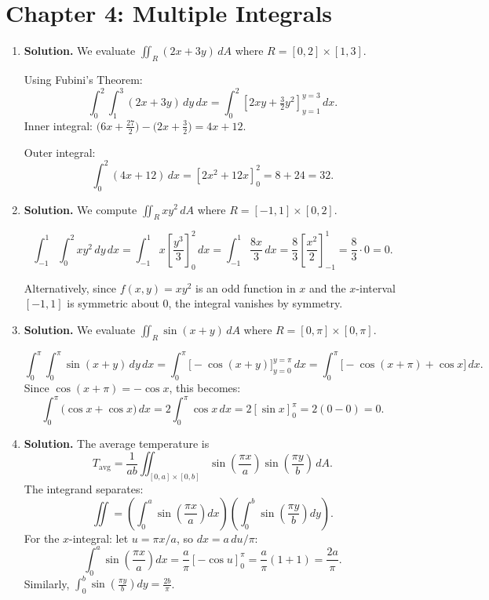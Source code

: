 \chapter{Chapter 4: Multiple Integrals}

\begin{enumerate}

\item \textbf{Solution.}
We evaluate $\displaystyle\iint_R (2x+3y)\,dA$ where $R=[0,2]\times[1,3]$.

Using Fubini's Theorem:
\[
\int_0^2\int_1^3 (2x+3y)\,dy\,dx = \int_0^2 \left[2xy + \tfrac{3}{2}y^2\right]_{y=1}^{y=3}\,dx.
\]
Inner integral: $\bigl(6x + \tfrac{27}{2}\bigr) - \bigl(2x + \tfrac{3}{2}\bigr) = 4x + 12$.

Outer integral:
\[
\int_0^2 (4x+12)\,dx = \left[2x^2 + 12x\right]_0^2 = 8 + 24 = \boxed{32}.
\]

\item \textbf{Solution.}
We compute $\displaystyle\iint_R xy^2\,dA$ where $R=[-1,1]\times[0,2]$.

\[
\int_{-1}^1\int_0^2 xy^2\,dy\,dx = \int_{-1}^1 x\left[\frac{y^3}{3}\right]_0^2\,dx = \int_{-1}^1 \frac{8x}{3}\,dx = \frac{8}{3}\left[\frac{x^2}{2}\right]_{-1}^1 = \frac{8}{3}\cdot 0 = \boxed{0}.
\]

Alternatively, since $f(x,y) = xy^2$ is an odd function in $x$ and the $x$-interval $[-1,1]$ is symmetric about $0$, the integral vanishes by symmetry.

\item \textbf{Solution.}
We evaluate $\displaystyle\iint_R \sin(x+y)\,dA$ where $R=[0,\pi]\times[0,\pi]$.

\[
\int_0^\pi\int_0^\pi \sin(x+y)\,dy\,dx = \int_0^\pi \bigl[-\cos(x+y)\bigr]_{y=0}^{y=\pi}\,dx = \int_0^\pi \bigl[-\cos(x+\pi)+\cos x\bigr]\,dx.
\]
Since $\cos(x+\pi) = -\cos x$, this becomes:
\[
\int_0^\pi \bigl(\cos x + \cos x\bigr)\,dx = 2\int_0^\pi \cos x\,dx = 2[\sin x]_0^\pi = 2(0-0) = \boxed{0}.
\]

\item \textbf{Solution.}
The average temperature is
\[
T_{\text{avg}} = \frac{1}{ab}\iint_{[0,a]\times[0,b]} \sin\!\left(\frac{\pi x}{a}\right)\sin\!\left(\frac{\pi y}{b}\right)\,dA.
\]
The integrand separates:
\[
\iint = \left(\int_0^a \sin\!\left(\frac{\pi x}{a}\right)dx\right)\!\left(\int_0^b \sin\!\left(\frac{\pi y}{b}\right)dy\right).
\]
For the $x$-integral: let $u = \pi x/a$, so $dx = a\,du/\pi$:
\[
\int_0^a \sin\!\left(\frac{\pi x}{a}\right)dx = \frac{a}{\pi}[-\cos u]_0^\pi = \frac{a}{\pi}(1+1) = \frac{2a}{\pi}.
\]
Similarly, $\displaystyle\int_0^b \sin\!\left(\frac{\pi y}{b}\right)dy = \frac{2b}{\pi}$.


\end{enumerate}
